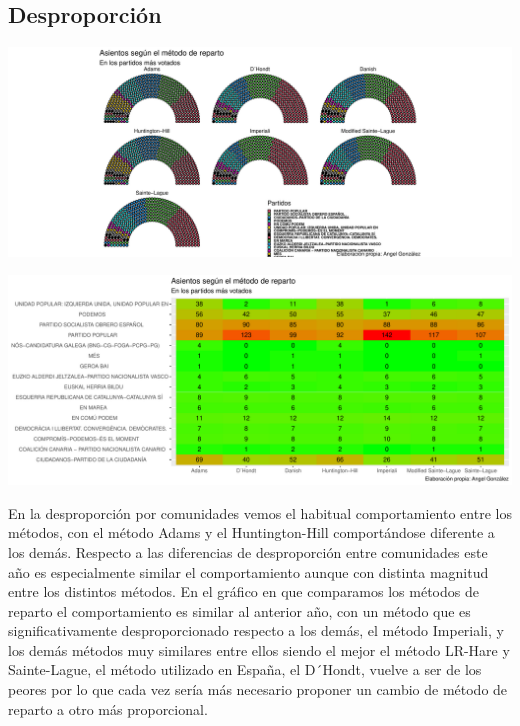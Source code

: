 \documentclass[12pt,a4paper,]{book}
\numberwithin{dummy}{section}
\theoremstyle{ocrenumbox}
\theoremstyle{blacknumex}
\theoremstyle{blacknumbox}
\theoremstyle{ocrenum}
\theoremstyle{ocrenum}
\begin{document}
\hypertarget{desproporciuxf3n-12}{%
\subsection{Desproporción}\label{desproporciuxf3n-12}}

\begin{center}\includegraphics[width=1\linewidth]{figurasR/unnamed-chunk-110-1} \end{center}

\begin{center}\includegraphics[width=1\linewidth]{figurasR/unnamed-chunk-110-2} \end{center}

En la desproporción por comunidades vemos el habitual comportamiento
entre los métodos, con el método Adams y el Huntington-Hill
comportándose diferente a los demás. Respecto a las diferencias de
desproporción entre comunidades este año es especialmente similar el
comportamiento aunque con distinta magnitud entre los distintos métodos.
En el gráfico en que comparamos los métodos de reparto el comportamiento
es similar al anterior año, con un método que es significativamente
desproporcionado respecto a los demás, el método Imperiali, y los demás
métodos muy similares entre ellos siendo el mejor el método LR-Hare y
Sainte-Lague, el método utilizado en España, el D´Hondt, vuelve a ser de
los peores por lo que cada vez sería más necesario proponer un cambio de
método de reparto a otro más proporcional.
\end{document}
